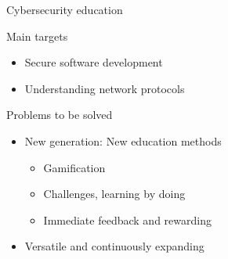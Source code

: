 \documentclass[12 pt]{beamer}
\newcommand{\tanedo}{tanedolight}		%
\newcommand{\Comment}[1]{\textcolor{Comment}{\footnotesize{#1}\normalsize}} %
\begin{document}
{\begin{frame}[c]
\begin{center}
\end{center}
\end{frame}
}



\begin{frame}{Cybersecurity education}

  \begin{block}{Main targets}
    \begin{itemize}
        \item{Secure software development}
        \item{Understanding network protocols}
    \end{itemize}
  \end{block}

  \begin{block}{Problems to be solved}
    \begin{itemize}
        \item{New generation: New education methods}
          \begin{itemize}
            \item{Gamification}
            \item{Challenges, learning by doing}
            \item{Immediate feedback and rewarding}
          \end{itemize}
        \item{Versatile and continuously expanding}
    \end{itemize}
  \end{block}

\end{frame}
\end{document}
